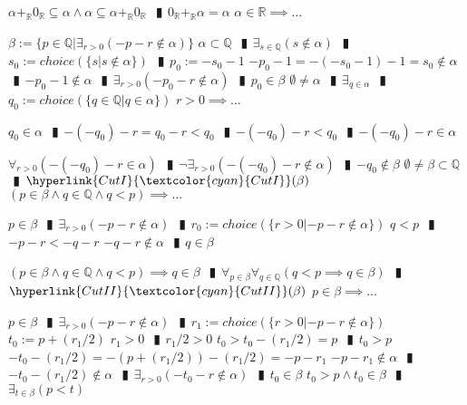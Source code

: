 \documentclass{book}
\newcommand{\rf}[1]{\hyperlink{#1}{\textcolor{cyan}{#1}}}
\newcommand{\abr}{:=}
\newcommand{\pipe}{$\phantom{(}\vrectangleblack\phantom{)}$}
\newcommand{\pr}[1]{\left(#1\right)}
\begin{document}
\begin{enumerate}
\begin{enumerate}
    \lit $\alpha +_{\mathbb{R}} 0_{\mathbb{R}} \subseteq \alpha \land \alpha \subseteq \alpha +_{\mathbb{R}} 0_{\mathbb{R}}$ \pipe $0_{\mathbb{R}} +_{\mathbb{R}} \alpha = \alpha$
    \lit $\alpha \in \mathbb{R} \implies \ldots$
    \begin{enumerate}
      \lit $\beta \abr \{p \in \mathbb{Q} | \exists_{r > 0}(-p - r \notin \alpha)\}$
      \lit $\alpha \subset \mathbb{Q}$ \pipe $\exists_{s \in \mathbb{Q}}(s \notin \alpha)$ \pipe $s_0 \abr choice(\{s | s \notin \alpha\})$ \pipe $p_0 \abr -s_0 - 1$
      \lit $-p_0 - 1 = -(-s_0 - 1) - 1 = s_0 \notin \alpha$ \pipe $-p_0 - 1 \notin \alpha$ \pipe $\exists_{r > 0}(-p_0 - r \notin \alpha)$ \pipe $p_0 \in \beta$
      \lit $\emptyset \neq \alpha$ \pipe $\exists_{q \in \alpha}$ \pipe $q_0 \abr choice(\{q \in \mathbb{Q} | q \in \alpha\})$
      \lit $r > 0 \implies \ldots$
      \begin{enumerate}
        \lit $q_0 \in \alpha$ \pipe $-(-q_0) - r = q_0 - r < q_0$ \pipe $-(-q_0) - r < q_0$ \pipe $-(-q_0) - r \in \alpha$
      \end{enumerate}
      \lit $\forall_{r > 0}\pr{-(-q_0) - r \in \alpha}$ \pipe $\lnot \exists_{r > 0}(-(-q_0) -r \notin \alpha)$ \pipe $-q_0 \notin \beta$
      \lit $\emptyset \neq \beta \subset \mathbb{Q}$ \pipe $\rf{CutI}(\beta)$
      \lit $(p \in \beta \land q \in \mathbb{Q} \land q < p) \implies \ldots$
      \begin{enumerate}
        \lit $p \in \beta$ \pipe $\exists_{r > 0}(-p - r \notin \alpha)$ \pipe $r_0 \abr choice(\{r > 0 | -p - r \notin \alpha\})$
        \lit $q < p$ \pipe $-p - r < -q - r$
        \lit $-q -r \notin \alpha$ \pipe $q \in \beta$
      \end{enumerate}
      \lit $(p \in \beta \land q \in \mathbb{Q} \land q < p) \implies q \in \beta$ \pipe $\forall_{p \in \beta} \forall_{q \in \mathbb{Q}}(q < p \implies q \in \beta)$ \pipe $\rf{CutII}(\beta)$
      \lit $p \in \beta \implies \ldots$
      \begin{enumerate}
        \lit $p \in \beta$ \pipe $\exists_{r > 0}(-p - r \notin \alpha)$ \pipe $r_1 \abr choice(\{r > 0 | -p - r \notin \alpha\})$
        \lit $t_0 \abr p + (r_1 / 2)$
        \lit $r_1 > 0$ \pipe $r_1 / 2 > 0$
        \lit $t_0 > t_0 - (r_1 / 2) = p$ \pipe $t_0 > p$
        \lit $-t_0 - (r_1 / 2) = -(p + (r_1 / 2)) - (r_1 / 2) = -p - r_1$
        \lit $-p - r_1 \notin \alpha$ \pipe $-t_0 - (r_1 / 2) \notin \alpha$ \pipe $\exists_{r > 0}(-t_0 - r \notin \alpha)$ \pipe $t_0 \in \beta$
        \lit $t_0 > p \land t_0 \in \beta$ \pipe $\exists_{t \in \beta}(p < t)$

\end{enumerate}
\end{enumerate}
\end{enumerate}
\end{enumerate}
\end{document}

